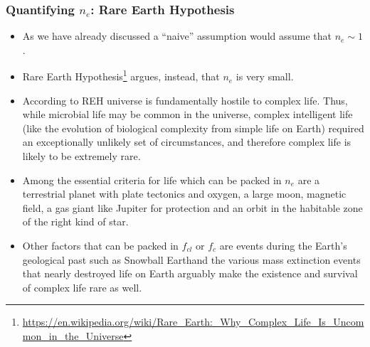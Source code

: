 \begin{frame}
\frametitle{Quantifying $n_e$: Rare Earth Hypothesis}

\begin{itemize}
\item As we have already discussed a ``naive'' assumption would assume that $n_e \sim 1$. 
\item Rare Earth Hypothesis\footnote{\url{https://en.wikipedia.org/wiki/Rare_Earth:_Why_Complex_Life_Is_Uncommon_in_the_Universe}} argues, instead, 
that $n_e$ is very small.  
\item According to REH universe is fundamentally hostile to complex life. Thus, while microbial life may be common in the universe, complex intelligent life (like the evolution of biological complexity from simple life on Earth) required an exceptionally unlikely set of circumstances, and therefore complex life is likely to be extremely rare. 
\item Among the essential criteria for life which can be packed in $n_e$ are a terrestrial planet with plate tectonics and oxygen, a large moon, magnetic field, a gas giant like Jupiter for protection and an orbit in the habitable zone of the right kind of star. 
\item Other factors that can be packed in $f_{cl}$ or $f_c$ are events during the Earth's geological past such as Snowball Earthand the various mass extinction events that nearly destroyed life on Earth arguably make the existence and survival of complex life rare as well. 
\end{itemize}
\end{frame}



